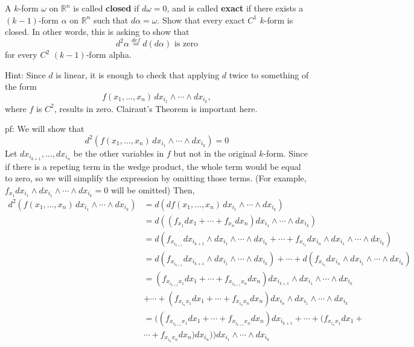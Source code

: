 \documentclass[11pt,letterpaper,cm]{nupset}
\begin{document}
\begin{problem}[Exercise 2] A $k$-form $\omega$ on $\mathbb{R}^n$ is called \textbf{closed} if $d\omega = 0$, and is called \textbf{exact} if there exists a $(k-1)$-form $\alpha$ on $\mathbb{R}^n$ such that $d\alpha = \omega$. Show that every exact $C^1$ $k$-form is closed. In other words, this is asking to show that
	$$d^2\alpha \stackrel{def}{=} d(d\alpha) \text{ is zero}$$
	for every $C^2$ $(k-1)$-form alpha. 
	\medskip
	
	Hint: Since $d$ is linear, it is enough to check that applying $d$ twice to something of the form
	$$f(x_1,\ldots,x_n)\,dx_{i_1}\wedge\cdots\wedge dx_{i_k},$$
	where $f$ is $C^2$, results in zero. Clairaut's Theorem is important here.
\end{problem}
\begin{solution}
	pf: We will show that 
	$$d^2(f(x_1,\ldots,x_n)\,dx_{i_1}\wedge\cdots\wedge dx_{i_k})=0$$
	Let $dx_{i_{k+1}},\ldots,dx_{i_n}$ be the other variables in $f$ but not in the original $k$-form. Since if there is a repeting term in the wedge product, the whole term would be equal to zero, so we will simplify the expression by omitting those terms. (For example, $f_{x_1}dx_{i_1}\wedge dx_{i_1}\wedge\cdots\wedge dx_{i_k}=0$ will be omitted) Then,
	\begin{align*}
		d^2(f(x_1,\ldots,x_n)\,dx_{i_1}\wedge\cdots\wedge dx_{i_k})&=d(df(x_1,\ldots,x_n)\,dx_{i_1}\wedge\cdots\wedge dx_{i_k})\\
		&=d((f_{x_1}dx_1+\cdots+f_{x_n}dx_n)dx_{i_1}\wedge\cdots\wedge dx_{i_k})\\
		&=d(f_{x_{i_{k+1}}}dx_{i_{k+1}}\wedge dx_{i_1}\wedge\cdots\wedge dx_{i_k}+\cdots+f_{x_{i_n}}dx_{i_n}\wedge dx_{i_1}\wedge\cdots\wedge dx_{i_k})\\
		&=d(f_{x_{i_{k+1}}}dx_{i_{k+1}}\wedge dx_{i_1}\wedge\cdots\wedge dx_{i_k})+\cdots+d(f_{x_{i_n}}dx_{i_n}\wedge dx_{i_1}\wedge\cdots\wedge dx_{i_k})\\
		&=(f_{x_{i_{k+1}}x_1}dx_1+\cdots+f_{x_{i_{k+1}}x_n}dx_n) dx_{i_{k+1}}\wedge dx_{i_1}\wedge\cdots\wedge dx_{i_k}\\
		&+\cdots+(f_{x_{i_{n}}x_1}dx_1+\cdots+f_{x_{i_{n}}x_n}dx_n) dx_{i_{n}}\wedge dx_{i_1}\wedge\cdots\wedge dx_{i_k}\\
		&=((f_{x_{i_{k+1}}x_1}dx_1+\cdots+f_{x_{i_{k+1}}x_n}dx_n) dx_{i_{k+1}}+\cdots+(f_{x_{i_{n}}x_1}dx_1+\\
		&\cdots+f_{x_{i_{n}}x_n}dx_n) dx_{i_{n}}))dx_{i_1}\wedge\cdots\wedge dx_{i_k}
	\end{align*}

\end{solution}
\end{document}

